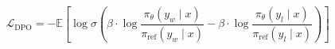 \documentclass[12pt]{article}
\begin{document}
\[
\mathcal{L}_{\text{DPO}} = -\mathbb{E} \left[ \log \sigma \left( \beta \cdot \log \frac{\pi_\theta(y_w \mid x)}{\pi_{\text{ref}}(y_w \mid x)} - \beta \cdot \log \frac{\pi_\theta(y_l \mid x)}{\pi_{\text{ref}}(y_l \mid x)} \right) \right]
\]
\end{document}
